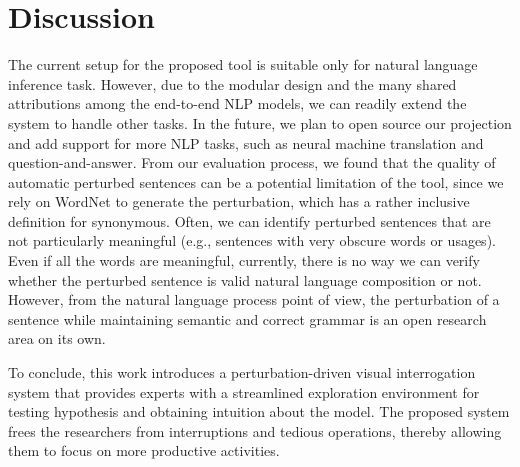 \section{Discussion}
The current setup for the proposed tool is suitable only for natural language inference task. However, due to the modular design and the many shared attributions among the end-to-end NLP models, we can readily extend the system to handle other tasks. In the future, we plan to open source our projection and add support for more NLP tasks, such as neural machine translation and question-and-answer.
%
From our evaluation process, we found that the quality of automatic perturbed sentences can be a potential limitation of the tool, since we rely on WordNet to generate the perturbation, which has a rather inclusive definition for synonymous. Often, we can identify perturbed sentences that are not particularly meaningful (e.g., sentences with very obscure words or usages). 
Even if all the words are meaningful, currently, there is no way we can verify whether the perturbed sentence is valid natural language composition or not.
%
However, from the natural language process point of view, the perturbation of a sentence while maintaining semantic and correct grammar is an open research area on its own. 

To conclude, this work introduces a perturbation-driven visual interrogation system that provides experts with a streamlined exploration environment for testing hypothesis and obtaining intuition about the model. The proposed system frees the researchers from interruptions and tedious operations, thereby allowing them to focus on more productive activities.

